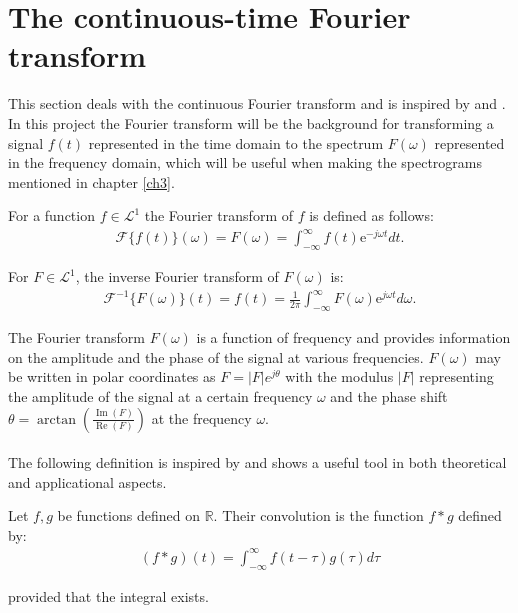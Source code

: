 \section{The continuous-time Fourier transform} \label{sec:cont_Fourier_Transform}
This section deals with the continuous Fourier transform and is inspired by \cite{FourierTrans} and \cite{pages 204-224, FAA}. In this project the Fourier transform will be the background for transforming a signal $f(t)$ represented in the time domain to the spectrum $F(\omega)$ represented in the frequency domain, which will be useful when making the spectrograms mentioned in chapter \ref{ch3}.

\begin{definition} \label{def:Fourier_trans}
For a function $f \in \mathcal{L}^1$ the Fourier transform of $f$ is defined as follows:
\begin{align*}
\mathcal{F}\{f(t)\}(\omega) = F(\omega) = \int_{-\infty}^\infty f(t) \text{e}^{-j \omega t} dt.
\end{align*}
\end{definition}

\begin{definition} \label{def:InverseFourier_trans}
For $F \in \mathcal{L}^1$, the inverse Fourier transform of $F(\omega)$ is:
\begin{align*}
\mathcal{F}^{-1}\{F(\omega)\}(t) = f(t) = \frac{1}{2\pi} \int_{-\infty}^\infty F(\omega) \text{e}^{j \omega t} d\omega.
\end{align*}
\end{definition}

The Fourier transform $F(\omega)$ is a function of frequency and provides information on the amplitude and the phase of the signal at various frequencies. $F(\omega)$ may be written in polar coordinates as $F = |F|e^{j\theta}$ with the modulus $|F|$ representing the amplitude of the signal at a certain frequency $\omega$ and the phase shift $\theta = \arctan \left(\frac{\operatorname{Im}(F)}{\operatorname{Re}(F)} \right)$ at the frequency $\omega$.
\\ \\
The following definition is inspired by \cite{page 206, FAA} and shows a useful tool in both theoretical and applicational aspects.
\begin{definition} \label{def:Convol}
Let $f,g$ be functions defined on $\mathbb{R}$. Their convolution is the function $f*g$ defined by:
\begin{align*}
(f*g)(t) = \int_{-\infty}^\infty f(t-\tau) g(\tau) d\tau
\end{align*}

provided that the integral exists.
\end{definition}

